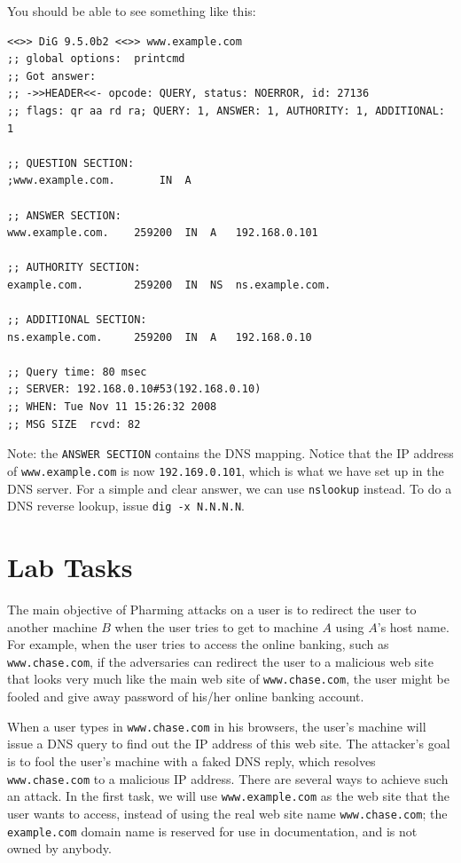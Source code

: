 You should be able to see something like this:

\begin{verbatim}
<<>> DiG 9.5.0b2 <<>> www.example.com
;; global options:  printcmd
;; Got answer:
;; ->>HEADER<<- opcode: QUERY, status: NOERROR, id: 27136
;; flags: qr aa rd ra; QUERY: 1, ANSWER: 1, AUTHORITY: 1, ADDITIONAL: 1

;; QUESTION SECTION:
;www.example.com.		IN	A

;; ANSWER SECTION:
www.example.com.	259200	IN	A	192.168.0.101

;; AUTHORITY SECTION:
example.com.		259200	IN	NS	ns.example.com.

;; ADDITIONAL SECTION:
ns.example.com.		259200	IN	A	192.168.0.10

;; Query time: 80 msec
;; SERVER: 192.168.0.10#53(192.168.0.10)
;; WHEN: Tue Nov 11 15:26:32 2008
;; MSG SIZE  rcvd: 82
\end{verbatim}

Note: the {\tt ANSWER SECTION} contains the DNS mapping. Notice that
the IP address of {\tt www.example.com} is now {\tt 192.169.0.101}, which
is what we have set up in the DNS server.
For a simple and clear answer,
we can use {\tt nslookup} instead. 
To do a DNS reverse lookup, issue {\tt dig -x N.N.N.N}.


\section{Lab Tasks}


The main objective of Pharming attacks on a user is to redirect the user
to another machine $B$ when the user tries to get to machine $A$ using
$A$'s host name. For example, when the user tries to access the online banking,
such as {\tt www.chase.com}, if the adversaries can redirect the user 
to a malicious web site that looks very much like the main web site 
of {\tt www.chase.com}, the user might be fooled and give away password
of his/her online banking account.

When a user types in {\tt www.chase.com} in his browsers, the user's machine will issue
a DNS query to find out the IP address of this web site. The attacker's goal
is to fool the user's machine with a faked DNS reply, which resolves
{\tt www.chase.com} to a malicious IP address. There are several ways
to achieve such an attack. In the first task, we will 
use {\tt www.example.com} as the web site that the user wants to access,
instead of using the real web site name {\tt www.chase.com}; 
the {\tt example.com} domain name is reserved for use in 
documentation, and is not owned by anybody. 


